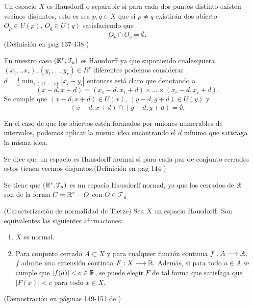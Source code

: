 \begin{definicion}[Hausdorff]
    Un espacio $X$ es Hausdorff o separable si para cada dos puntos distinto existen vecinos disjuntos, esto es 
    sea $p,q \in X$ que  si $p \neq q$ existirán dos abierto $O_p \in U(p)$, $O_q \in U(q)$ satisfaciendo que 
    \begin{equation}
        O_p \cap O_q = \emptyset.
    \end{equation}
    (Definición en pag 137-138 \cite{james1966topology})

    En nuestro caso $(\mathbb{R}^r, \mathcal{T}_u)$ es Hausdorff ya 
    que suponiendo cualesquiera 
    $(x_1,..x_r),(y_1, ..., y_r) \in R^r$ diferentes
    podemos considerar $d = \frac{1}{3}\min_{i\in \{1,...,r\}}|x_i-y_i|$ entonces está claro que 
    denotando a 
    \begin{equation}
        (x-d, x+d) = (x_1-d, x_1+d) \times ...  \times (x_r-d, x_r+d).
    \end{equation}
    Se cumple que 
    $(x-d, x+d) \in U(x)$,
    $(y-d, y+d) \in U(y)$  y 
    \begin{equation}
        (x-d, x+d) \cap (y-d, y+d) = \emptyset.
    \end{equation}

    En el caso de que los abiertos estén formados por uniones numerables de intervalos, 
    podemos aplicar la misma idea encontrando el $d$ mínimo que satisfaga la misma idea.
\end{definicion}

\begin{definicion}
    Se dice que un espacio es Hausdorff normal si para cada par de conjunto cerrados  
    estos tienen vecinos disjuntos.(Definición en pag 144 \cite{james1966topology})

    Se tiene que $(\mathbb{R}^r, \mathcal{T}_u)$ es un espacio Hausdorff normal, ya que los cerrados de $\mathbb{R}$
    son de la forma $C = \mathbb{R}^r - O$ con $O \in \mathcal{T}_u$ 
\end{definicion}

\begin{teorema}(Caracterización de normalidad de Tietze)\label{teo:Tietze}
    Sea $X$ un espacio Hausdorff. Son equivalentes las siguientes afirmaciones: 
    \begin{enumerate}
        \item $X$ es normal.
        \item Para conjunto cerrado $A \subset X$ y para cualquier función continua 
        $f: A \longrightarrow \mathbb{R}$, $f$ admite una extensión continua $F:X \longrightarrow \mathbb{R}.$
        Además, si para todo $a \in A$ se cumple que $|f(a)| < c \in \mathbb{R}$, se puede elegir $F$
        de tal forma que satisfaga que $|F(x)| < c$ para todo $x\in X.$ 
    \end{enumerate}
    (Demostración en páginas 149-151 de \cite{james1966topology})
\end{teorema}

